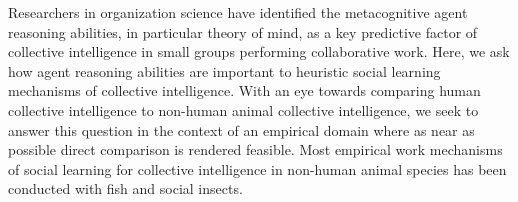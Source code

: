 \documentclass[12pt,letterpaper]{article}
\begin{document}
Researchers in organization science have identified the metacognitive agent reasoning abilities, in particular theory of mind, as a key predictive factor of collective intelligence in small groups performing collaborative work.  Here, we ask how agent reasoning abilities are important to heuristic social learning mechanisms of collective intelligence.  With an eye towards comparing human collective intelligence to non-human animal collective intelligence, we seek to answer this question in the context of an empirical domain where as near as possible direct comparison is rendered feasible.  Most empirical work mechanisms of social learning for collective intelligence in non-human animal species has been conducted with fish and social insects.






\end{document}
